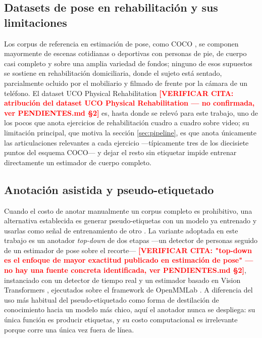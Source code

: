\documentclass[10pt,a4paper,twocolumn]{article}
\newcommand{\verificarcita}[1]{\textcolor{red}{\textbf{[VERIFICAR CITA: #1]}}}
\begin{document}
\subsection{Datasets de pose en rehabilitación y sus limitaciones}
Los corpus de referencia en estimación de pose, como COCO \cite{lin2014}, se
componen mayormente de escenas cotidianas o deportivas con personas de pie,
de cuerpo casi completo y sobre una amplia variedad de fondos; ninguno de
esos supuestos se sostiene en rehabilitación domiciliaria, donde el sujeto
está sentado, parcialmente ocluido por el mobiliario y filmado de frente por
la cámara de un teléfono. El dataset UCO Physical Rehabilitation
\verificarcita{atribución del dataset UCO Physical Rehabilitation — no
confirmada, ver PENDIENTES.md \S2} es, hasta donde se relevó para este
trabajo, uno de los pocos que anota ejercicios de rehabilitación cuadro a
cuadro sobre video; su limitación principal, que motiva la sección
\ref{sec:pipeline}, es que anota únicamente las articulaciones relevantes a
cada ejercicio ---típicamente tres de los diecisiete puntos del esquema
COCO--- y dejar el resto sin etiquetar impide entrenar directamente un
estimador de cuerpo completo.

\subsection{Anotación asistida y pseudo-etiquetado}
Cuando el costo de anotar manualmente un corpus completo es prohibitivo, una
alternativa establecida es generar pseudo-etiquetas con un modelo ya
entrenado y usarlas como señal de entrenamiento de otro \cite{lee2013}. La
variante adoptada en este trabajo es un anotador \emph{top-down} de dos
etapas ---un detector de personas seguido de un estimador de pose sobre el
recorte--- \verificarcita{"top-down es el enfoque de mayor exactitud
publicado en estimación de pose" — no hay una fuente concreta identificada,
ver PENDIENTES.md \S2}, instanciado con un detector de tiempo real
\cite{lyu2022} y un estimador basado en Vision Transformers \cite{xu2022},
ejecutados sobre el framework de OpenMMLab \cite{mmpose2020}. A diferencia
del uso más habitual del pseudo-etiquetado como forma de destilación de
conocimiento hacia un modelo más chico, aquí el anotador nunca se despliega:
su única función es producir etiquetas, y su costo computacional es
irrelevante porque corre una única vez fuera de línea.
\end{document}

